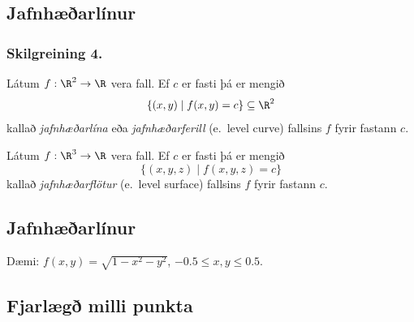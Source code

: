 \subsection{Jafnhæðarlínur}
 \subsubsection {Skilgreining 4.}
  Látum $f:\R^2\rightarrow \R$ vera fall.  Ef $c$ er fasti þá er mengið 
$$\{(x,y)\mid f(x,y)=c\}\subseteq \R^2$$
kallað {\em jafnhæðarlína} eða {\em jafnhæðarferill} (e.~level curve) fallsins $f$ fyrir fastann $c$.

 Látum $f:\R^3\rightarrow \R$ vera fall.  Ef $c$ er fasti þá er mengið 
$$\{(x,y,z)\mid f(x,y,z)=c\}$$
kallað {\em jafnhæðarflötur} (e.~level surface)  
fallsins $f$ fyrir fastann $c$.
 


\subsection{Jafnhæðarlínur}
 Dæmi: $f(x,y) = \sqrt{1-x^2-y^2}$, $-0.5\leq x,y\leq 0.5$.         

\begin{figure} [h]
\begin {center}  \end {center}
\end {figure}  


\subsection{Fjarlægð milli punkta}
